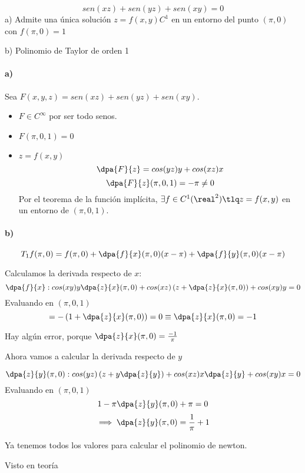 \begin{problem}[15]
\[sen(xz)+sen(yz)+sen(xy) = 0\]
a) Admite una única solución $z=f(x,y) C^1$ en un entorno del punto $(\pi,0)$ con $f(\pi,0) = 1$

b) Polinomio de Taylor de orden 1

\solution
\paragraph{a)}
Sea $F(x,y,z) = sen(xz)+sen(yz)+sen(xy)$.
\begin{itemize}
\item $F \in C^{\infty}$ por ser todo senos.
\item $F(\pi,0,1) = 0$
\item $z = f(x,y)$
\[\dpa{F}{z} = cos(yz)y + cos(xz)x\]
\[\dpa{F}{z}(\pi,0,1) = -\pi \neq 0\]
Por el teorema de la función implícita, $\exists f \in C^1(\real^2) \tlq z = f(x,y)$ en un entorno de $(\pi,0,1)$.
\end{itemize}
\paragraph{b)}
\[T_1f(\pi,0) =  f(\pi,0) + \dpa{f}{x}(\pi,0)(x-\pi) + \dpa{f}{y}(\pi,0)(x-\pi)\]

Calculamos la derivada respecto de $x$:
\[\dpa{f}{x} : cos(xy)y\dpa{z}{x}(\pi,0) + cos(xz)\left(z+\dpa{z}{x}(\pi,0)\right) + cos(xy)y = 0\]
Evaluando en $(\pi,0,1)$
\[= -\left(1+\dpa{z}{x}(\pi,0)\right) = 0 \equiv \dpa{z}{x}(\pi,0) = -1\]

Hay algún error, porque
$ \dpa{z}{x}(\pi,0) = \frac{-1}{\pi}$

Ahora vamos a calcular la derivada respecto de $y$

\[\dpa{z}{y}(\pi,0): cos(yz)\left(z+y\dpa{z}{y}\right) + cos(xz)x\dpa{z}{y} + cos(xy)x = 0\]
Evaluando en $(\pi,0,1)$
\[1-\pi\dpa{z}{y}(\pi,0) + \pi = 0\]
\[\implies \dpa{z}{y}(\pi,0)= \frac{1}{\pi} + 1\]

Ya tenemos todos los valores para calcular el polinomio de newton.
\end{problem}
 
  \begin{problem}[16]
 \solution
 Visto en teoría
 \end{problem}
 
